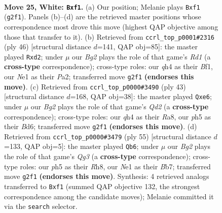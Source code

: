 \documentclass[11pt]{article}
\begin{document}
\clearpage

\begin{figure}[p]\centering
\begin{subfigure}{0.46\textwidth}\centering
\resizebox{\linewidth}{!}{%
\newchessgame
\chessboard[
  setfen={r1b4r/1pN3k1/1n6/2R3pp/1n5q/1Q1P1P2/P5B1/4NqK1 w - - 0 25},
  showmover=false,
  pgfstyle=straightmove, color=movearrow, markmove={g2-f1}
]}
\caption{}
\end{subfigure}\hfill
\begin{subfigure}{0.46\textwidth}\centering
\resizebox{\linewidth}{!}{%
\newchessgame
\chessboard[
  setfen={r1b2rk1/1n5p/p1pp2p1/2P3P1/N7/8/PP1q2P1/2KR1B1R w - - 0 24},
  showmover=false,
  pgfstyle=straightmove, color=movearrow, markmove={d1-d2}
]}
\caption{}
\end{subfigure}
\\[4pt]
\begin{subfigure}{0.46\textwidth}\centering
\resizebox{\linewidth}{!}{%
\newchessgame
\chessboard[
  setfen={r5k1/2pq2p1/3bQn1p/p2n4/1r1P4/2N2N1P/1P3PP1/R1B1R1K1 b - - 0 22},
  showmover=false,
  pgfstyle=straightmove, color=movearrow, markmove={d7-e6}
]}
\caption{}
\end{subfigure}\hfill
\begin{subfigure}{0.46\textwidth}\centering
\resizebox{\linewidth}{!}{%
\newchessgame
\chessboard[
  setfen={5k1r/1b2bpN1/p5qP/8/1nQp1B2/3P3R/1P2N3/4K3 b - - 2 28},
  showmover=false,
  pgfstyle=straightmove, color=movearrow, markmove={g6-b6}
]}
\caption{}
\end{subfigure}
\caption{\textbf{Move 25, White: \texttt{Bxf1}.} (a) Our position; Melanie plays \texttt{Bxf1} (\texttt{g2f1}). Panels (b)--(d) are the retrieved master positions whose correspondence most drove this move (highest QAP objective among those that transfer to it). (b) Retrieved from \texttt{ccrl\_top\_p0001\#2316} (ply 46) [structural distance $d$=141, QAP obj=85]: the master played \texttt{Rxd2}; under $\mu$ our \emph{Bg2} plays the role of that game's \emph{Rd1} (a \textbf{cross-type} correspondence); cross-type roles: our \emph{q}h4 as their \emph{B}f1, our \emph{N}e1 as their \emph{P}a2; transferred move \texttt{g2f1} \textbf{(endorses this move)}. (c) Retrieved from \texttt{ccrl\_top\_p0000\#3490} (ply 43) [structural distance $d$=168, QAP obj=38]: the master played \texttt{Qxe6}; under $\mu$ our \emph{Bg2} plays the role of that game's \emph{Qd2} (a \textbf{cross-type} correspondence); cross-type roles: our \emph{q}h4 as their \emph{R}a8, our \emph{p}h5 as their \emph{B}d6; transferred move \texttt{g2f1} \textbf{(endorses this move)}. (d) Retrieved from \texttt{ccrl\_top\_p0000\#3479} (ply 55) [structural distance $d$=133, QAP obj=5]: the master played \texttt{Qb6}; under $\mu$ our \emph{Bg2} plays the role of that game's \emph{Qg3} (a \textbf{cross-type} correspondence); cross-type roles: our \emph{p}h5 as their \emph{R}h8, our \emph{N}e1 as their \emph{B}b7; transferred move \texttt{g2f1} \textbf{(endorses this move)}. Synthesis: 4 retrieved analogs transferred to \texttt{Bxf1} (summed QAP objective 132, the strongest correspondence among the candidate moves); Melanie committed it via the \texttt{search} selector.}
\label{fig:thought-m48}
\end{figure}
\end{document}
